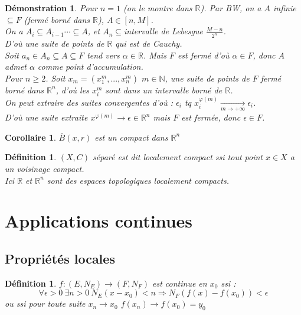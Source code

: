 \documentclass[a4paper, oneside]{report}
\theoremstyle{break}
\newtheorem{defi}[thm]{Définition}
\newtheorem{cor}[thm]{Corollaire}
\newtheorem*{demo}{Démonstration}
\newcommand{\R}{\mathbb{R}}
\newcommand{\N}{\mathbb{N}}
\begin{document}
\begin{demo}
Pour $n=1$ (on le montre dans $\R$). Par BW, on a $A$ infinie $\subseteq F$ (fermé borné dans $\R$), $A\in [n,M]$.\\
On a $A_i\subseteq A_{i-1}\cdots \subseteq A$, et $A_n \subseteq $intervalle de Lebesgue $\frac{M-n}{2^n}$.\\
D'où une suite de points de $\R$ qui est de Cauchy.\\
Soit $a_n\in A_n\subseteq A \subseteq F$ tend vers $\alpha \in \R$. Mais $F$ est fermé d'où $\alpha \in F$, donc $A$ admet $\alpha$ comme point d'accumulation.\\
 
Pour $n\geq 2$. Soit $x_m = (x_1^m,...,x_n^m)$ $m\in \N$, une suite de points de $F$ fermé borné dans $\R^n$, d'où les $x_i^m$ sont dans un intervalle borné de $\R$.\\
On peut extraire des suites convergentes d'où : $\epsilon_i$ tq $x_i^{\varphi(m)}\underset{m \rightarrow +\infty}{\rightarrow }\epsilon_i$.\\
D'où une suite extraite $x^{\varphi(m)}\rightarrow \epsilon \in \R^n$ mais $F$ est fermée, donc $\epsilon \in F$.\end{demo}


\begin{cor}
$\bar{B}(x,r)$ est un compact dans $\R^n$
\end{cor}


\begin{defi}
$(X,C)$ séparé est dit localement compact ssi tout point $x\in X$ a un voisinage compact.\\
Ici $\R$ et $\R^n$ sont des espaces topologiques localement compacts.
\end{defi}


\section{Applications continues}

\subsection{Propriétés locales}

\begin{defi}
$f:(E,N_E)\rightarrow (F,N_F)$ est continue en $x_0$ ssi :
$$\forall \epsilon >0~\exists n>0~N_E(x-x_0)<n\Rightarrow N_F(f(x)-f(x_0)) < \epsilon$$
ou ssi pour toute suite $x_n\rightarrow x_0$ $f(x_n)\rightarrow f(x_0)=y_0$
\end{defi}
\end{document}
